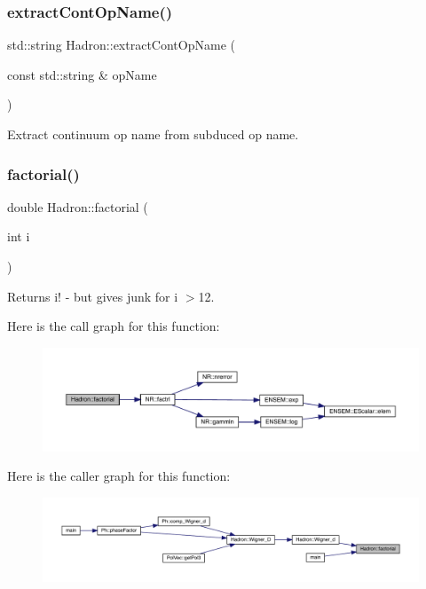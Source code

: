 \subsubsection{\texorpdfstring{extractContOpName()}{extractContOpName()}}
{\footnotesize\ttfamily std\+::string Hadron\+::extract\+Cont\+Op\+Name (\begin{DoxyParamCaption}\item[{const std\+::string \&}]{op\+Name }\end{DoxyParamCaption})}



Extract continuum op name from subduced op name. 

\mbox{\label{namespaceHadron_a0df3fb454ec05867e44777d4f5a6b7f7}} 
\subsubsection{\texorpdfstring{factorial()}{factorial()}}
{\footnotesize\ttfamily double Hadron\+::factorial (\begin{DoxyParamCaption}\item[{int}]{i }\end{DoxyParamCaption})\hspace{0.3cm}{\ttfamily [inline]}}



Returns i! -\/ but gives junk for i $>$12. 

Here is the call graph for this function\+:
\nopagebreak
\begin{figure}[H]
\begin{center}
\leavevmode
\includegraphics[width=350pt]{d1/daf/namespaceHadron_a0df3fb454ec05867e44777d4f5a6b7f7_cgraph}
\end{center}
\end{figure}
Here is the caller graph for this function\+:
\nopagebreak
\begin{figure}[H]
\begin{center}
\leavevmode
\includegraphics[width=350pt]{d1/daf/namespaceHadron_a0df3fb454ec05867e44777d4f5a6b7f7_icgraph}
\end{center}
\end{figure}
\mbox{\label{namespaceHadron_aa258f26ea52528eac314f32a02bf8ac3}} 
